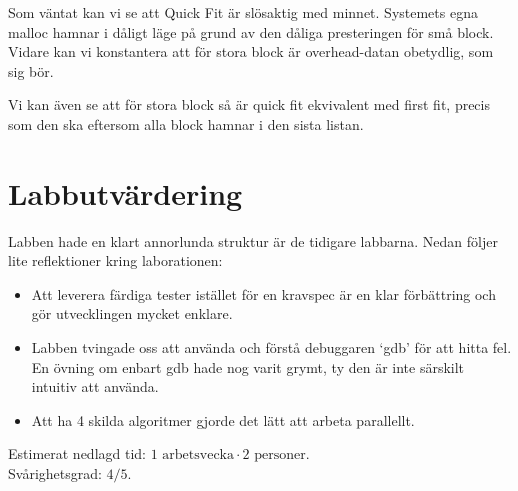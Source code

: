 \documentclass[a4paper,10pt,titlepage]{article}
\begin{document}
Som väntat kan vi se att Quick Fit är slösaktig med minnet. Systemets egna malloc hamnar i dåligt läge på grund av den dåliga presteringen för små block. Vidare kan vi konstantera att för stora block är overhead-datan obetydlig, som sig bör.

Vi kan även se att för stora block så är quick fit ekvivalent med first fit, precis som den ska eftersom alla block hamnar i den sista listan.



\newpage
\section{Labbutvärdering}

Labben hade en klart annorlunda struktur är de tidigare labbarna. Nedan följer lite reflektioner kring laborationen:

\begin{itemize}
	\item Att leverera färdiga tester istället för en kravspec är en klar förbättring och gör utvecklingen mycket enklare.
	\item Labben tvingade oss att använda och förstå debuggaren `gdb' för att hitta fel. En övning om enbart gdb hade nog varit grymt, ty den är inte särskilt intuitiv att använda.
	\item Att ha 4 skilda algoritmer gjorde det lätt att arbeta parallellt.
\end{itemize}

Estimerat nedlagd tid: $1 \text{ arbetsvecka} \cdot 2 \text{ personer}$. \\
Svårighetsgrad: $4/5$.
\end{document}
